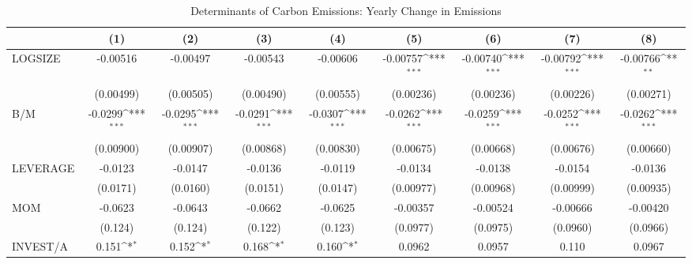 \begin{table}[htbp]\centering
\def\sym#1{\ifmmode^{#1}\else\(^{#1}\)\fi}
\caption{Determinants of Carbon Emissions: Yearly Change in Emissions}
\begin{tabular}{l*{8}{c}}
\hline\hline
                    &\multicolumn{1}{c}{(1)}         &\multicolumn{1}{c}{(2)}         &\multicolumn{1}{c}{(3)}         &\multicolumn{1}{c}{(4)}         &\multicolumn{1}{c}{(5)}         &\multicolumn{1}{c}{(6)}         &\multicolumn{1}{c}{(7)}         &\multicolumn{1}{c}{(8)}         \\
\hline
LOGSIZE             &    -0.00516         &    -0.00497         &    -0.00543         &    -0.00606         &    -0.00757\sym{***}&    -0.00740\sym{***}&    -0.00792\sym{***}&    -0.00766\sym{**} \\
                    &   (0.00499)         &   (0.00505)         &   (0.00490)         &   (0.00555)         &   (0.00236)         &   (0.00236)         &   (0.00226)         &   (0.00271)         \\
B/M                 &     -0.0299\sym{***}&     -0.0295\sym{***}&     -0.0291\sym{***}&     -0.0307\sym{***}&     -0.0262\sym{***}&     -0.0259\sym{***}&     -0.0252\sym{***}&     -0.0262\sym{***}\\
                    &   (0.00900)         &   (0.00907)         &   (0.00868)         &   (0.00830)         &   (0.00675)         &   (0.00668)         &   (0.00676)         &   (0.00660)         \\
LEVERAGE            &     -0.0123         &     -0.0147         &     -0.0136         &     -0.0119         &     -0.0134         &     -0.0138         &     -0.0154         &     -0.0136         \\
                    &    (0.0171)         &    (0.0160)         &    (0.0151)         &    (0.0147)         &   (0.00977)         &   (0.00968)         &   (0.00999)         &   (0.00935)         \\
MOM                 &     -0.0623         &     -0.0643         &     -0.0662         &     -0.0625         &    -0.00357         &    -0.00524         &    -0.00666         &    -0.00420         \\
                    &     (0.124)         &     (0.124)         &     (0.122)         &     (0.123)         &    (0.0977)         &    (0.0975)         &    (0.0960)         &    (0.0966)         \\
INVEST/A            &       0.151\sym{*}  &       0.152\sym{*}  &       0.168\sym{*}  &       0.160\sym{*}  &      0.0962         &      0.0957         &       0.110         &      0.0967         \\

\end{tabular}
\end{table}

